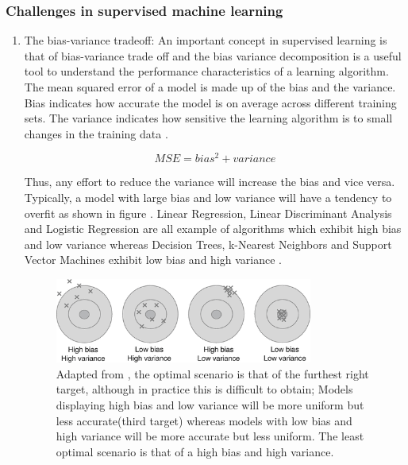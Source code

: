 \subsubsection{Challenges in supervised machine learning}
\begin{enumerate}
\item{The bias-variance tradeoff:}\newline
An important concept in supervised learning is that of bias-variance trade off and the bias variance decomposition is a useful tool to understand the performance characteristics of a learning algorithm. The  mean squared error of a model is made up of the bias and the variance. Bias indicates how accurate the model is on average across different training sets. The variance indicates how sensitive the learning algorithm is to small changes in the training data \citep{Sammut:2016gd}.

\begin{equation}
        MSE = bias^2 + variance
\end{equation}

Thus, any effort to reduce the variance will increase the bias and vice versa. Typically, a model with large bias and low variance will have a tendency to overfit as shown in figure . Linear Regression, Linear Discriminant Analysis and Logistic Regression are all example of algorithms which exhibit high bias and low variance \citep{Anonymous:2016um} whereas Decision Trees, k-Nearest Neighbors and Support Vector Machines exhibit low bias and high variance \citep{Anonymous:2016um}.

\begin{figure}[H]
    \centering
    \includegraphics[width=0.8\textwidth]{ThesisTemplate/usingLatex/images/biasvariance.png}
    \caption{Adapted from \citep{Sammut:2017vv}, the optimal scenario is that of the furthest right target, although in practice this is difficult to obtain; Models displaying high bias and low variance will be more uniform but less accurate(third target) whereas models with low bias and high variance will be more accurate but less uniform. The least optimal scenario is that of a high bias and high variance.}
    \label{fig:biasVariance}
\end{figure}


\end{enumerate}
